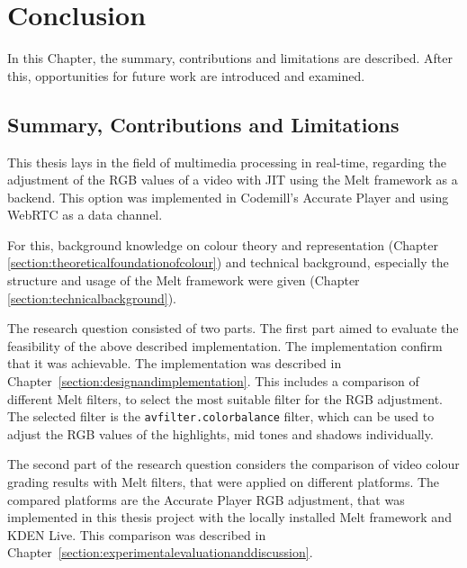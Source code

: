 \documentclass[../MasterThesis.tex]{subfiles}
\begin{document}
	
	
%
%
%
%
%
%
%
%
\newpage
\section{Conclusion} \label{section:conclusion}

In this Chapter, the summary, contributions and limitations are described. After this, opportunities for future work are introduced and examined.






\subsection{Summary, Contributions and Limitations} \label{subsection:summary}


This thesis lays in the field of multimedia processing in real-time, regarding the adjustment of the RGB values of a video with JIT using the Melt framework as a backend. This option was implemented in Codemill's Accurate Player and using WebRTC as a data channel.

For this, background knowledge on colour theory and representation (Chapter \ref{section:theoreticalfoundationofcolour}) and technical background, especially the structure and usage of the Melt framework were given (Chapter \ref{section:technicalbackground}).

The research question consisted of two parts. The first part aimed to evaluate the feasibility of the above described implementation. The implementation confirm that it was achievable. The implementation was described in Chapter~\ref{section:designandimplementation}. This includes a comparison of different Melt filters, to select the most suitable filter for the RGB adjustment. The selected filter is the \texttt{avfilter.colorbalance} filter, which can be used to adjust the RGB values of the highlights, mid tones and shadows individually.


The second part of the research question considers the comparison of video colour grading results with Melt filters, that were applied on different platforms. The compared platforms are the Accurate Player RGB adjustment, that was implemented in this thesis project with the locally installed Melt framework and KDEN Live. This comparison was described in Chapter~\ref{section:experimentalevaluationanddiscussion}.
\end{document}

